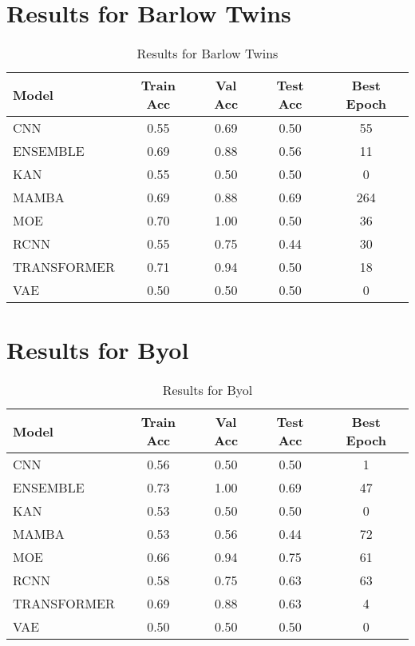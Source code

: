 \documentclass{article}
\begin{document}
\section*{Results for Barlow Twins}
\begin{table}[h!]
\centering
\begin{tabular}{lcccc}
\toprule
Model & Train Acc & Val Acc & Test Acc & Best Epoch \\
\midrule
CNN & 0.55 & 0.69 & 0.50 & 55 \\
ENSEMBLE & 0.69 & 0.88 & 0.56 & 11 \\
KAN & 0.55 & 0.50 & 0.50 & 0 \\
MAMBA & 0.69 & 0.88 & 0.69 & 264 \\
MOE & 0.70 & 1.00 & 0.50 & 36 \\
RCNN & 0.55 & 0.75 & 0.44 & 30 \\
TRANSFORMER & 0.71 & 0.94 & 0.50 & 18 \\
VAE & 0.50 & 0.50 & 0.50 & 0 \\
\bottomrule
\end{tabular}
\caption{Results for Barlow Twins}
\label{tab:barlow_twins}
\end{table}

\section*{Results for Byol}
\begin{table}[h!]
\centering
\begin{tabular}{lcccc}
\toprule
Model & Train Acc & Val Acc & Test Acc & Best Epoch \\
\midrule
CNN & 0.56 & 0.50 & 0.50 & 1 \\
ENSEMBLE & 0.73 & 1.00 & 0.69 & 47 \\
KAN & 0.53 & 0.50 & 0.50 & 0 \\
MAMBA & 0.53 & 0.56 & 0.44 & 72 \\
MOE & 0.66 & 0.94 & 0.75 & 61 \\
RCNN & 0.58 & 0.75 & 0.63 & 63 \\
TRANSFORMER & 0.69 & 0.88 & 0.63 & 4 \\
VAE & 0.50 & 0.50 & 0.50 & 0 \\
\bottomrule
\end{tabular}
\caption{Results for Byol}
\label{tab:byol}
\end{table}
\end{document}
